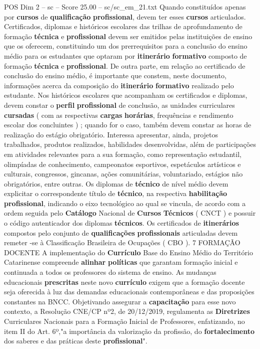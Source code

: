 \begin{textsample}{POS Dim 2 – sc – Score 25.00 – sc/sc\_em\_21.txt}
Quando constituídos apenas por \textbf{cursos} de \textbf{qualificação} \textbf{profissional}, devem ter esses \textbf{cursos} articulados.
Certificados, diplomas e históricos escolares das trilhas de aprofundamento de formação \textbf{técnica} e \textbf{profissional} devem ser emitidos pelas instituições de ensino que os oferecem, constituindo um dos prerrequisitos para a conclusão do ensino médio para os estudantes que optaram por \textbf{itinerário} \textbf{formativo} composto de formação \textbf{técnica} e \textbf{profissional}.
De outra parte, em relação ao certificado de conclusão do ensino médio, é importante que constem, neste documento, informações acerca da composição do \textbf{itinerário} \textbf{formativo} realizado pelo estudante.
Nos históricos escolares que acompanham os certificados e diplomas, devem constar o \textbf{perfil} \textbf{profissional} de conclusão, as unidades curriculares \textbf{cursadas} ( com as respectivas \textbf{cargas} \textbf{horárias}, frequências e rendimento escolar dos concluintes ) ; quando for o caso, também devem constar as horas de realização do estágio obrigatório.
Interessa apresentar, ainda, projetos trabalhados, produtos realizados, habilidades desenvolvidas, além de participações em atividades relevantes para a sua formação, como representação estudantil, olimpíadas de conhecimento, campeonatos esportivos, espetáculos artísticos e culturais, congressos, gincanas, ações comunitárias, voluntariado, estágios não obrigatórios, entre outras.
Os diplomas de \textbf{técnico} de nível médio devem explicitar o correspondente título de \textbf{técnico}, na respectiva \textbf{habilitação} \textbf{profissional}, indicando o eixo tecnológico ao qual se vincula, de acordo com a ordem seguida pelo \textbf{Catálogo} Nacional de \textbf{Cursos} \textbf{Técnicos} ( CNCT ) e possuir o código autenticador dos diplomas \textbf{técnicos}.
Os certificados de \textbf{itinerários} compostos pelo conjunto de \textbf{qualificações} \textbf{profissionais} articuladas devem remeter -se à Classificação Brasileira de Ocupações ( CBO ). 7 FORMAÇÃO DOCENTE A implementação do \textbf{Currículo} Base do Ensino Médio do Território Catarinense compreende \textbf{alinhar} \textbf{políticas} que garantam formação inicial e continuada a todos os professores do sistema de ensino.
As mudanças educacionais \textbf{prescritas} neste novo \textbf{currículo} exigem que a formação docente seja oferecida à luz das demandas educacionais contemporâneas e das proposições constantes na BNCC.
Objetivando assegurar a \textbf{capacitação} para esse novo contexto, a Resolução CNE/CP nº2, de 20/12/2019, regulamenta as \textbf{Diretrizes} Curriculares Nacionais para a Formação Inicial de Professores, enfatizando, no item II do Art. 6º,"a importância da valorização da profissão, do \textbf{fortalecimento} dos saberes e das práticas deste \textbf{profissional}".

\end{textsample}
